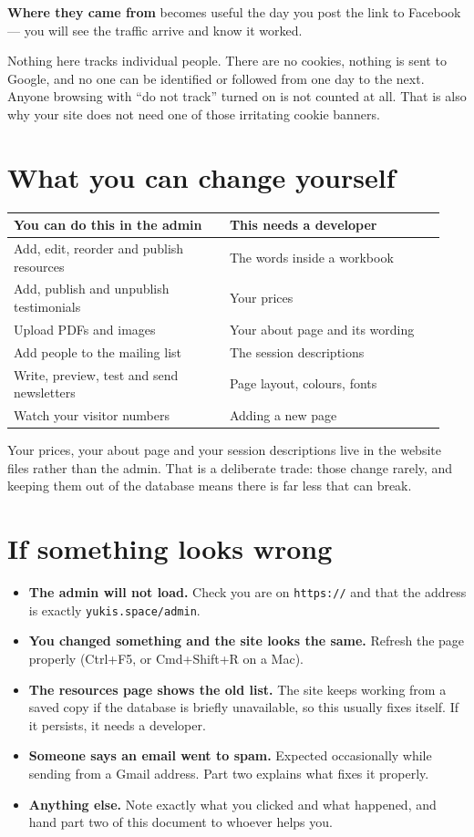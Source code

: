 \documentclass[11pt,a4paper]{article}
\newcommand{\lead}[1]{\textbf{\color{ink}#1}}
\newcommand{\code}[1]{\texttt{\small #1}}
\begin{document}
\lead{Where they came from} becomes useful the day you post the link to
Facebook --- you will see the traffic arrive and know it worked.

Nothing here tracks individual people. There are no cookies, nothing is sent to
Google, and no one can be identified or followed from one day to the next.
Anyone browsing with ``do not track'' turned on is not counted at all. That is
also why your site does not need one of those irritating cookie banners.

\section{What you can change yourself}

\begin{longtable}{@{}p{0.47\linewidth}p{0.47\linewidth}@{}}
\toprule
\textbf{You can do this in the admin} & \textbf{This needs a developer} \\
\midrule
\endhead
Add, edit, reorder and publish resources & The words inside a workbook \\
Add, publish and unpublish testimonials & Your prices \\
Upload PDFs and images & Your about page and its wording \\
Add people to the mailing list & The session descriptions \\
Write, preview, test and send newsletters & Page layout, colours, fonts \\
Watch your visitor numbers & Adding a new page \\
\bottomrule
\end{longtable}

Your prices, your about page and your session descriptions live in the website
files rather than the admin. That is a deliberate trade: those change rarely,
and keeping them out of the database means there is far less that can break.

\section{If something looks wrong}

\begin{itemize}
  \item \lead{The admin will not load.} Check you are on \code{https://} and
        that the address is exactly \code{yukis.space/admin}.
  \item \lead{You changed something and the site looks the same.} Refresh the
        page properly (Ctrl+F5, or Cmd+Shift+R on a Mac).
  \item \lead{The resources page shows the old list.} The site keeps working
        from a saved copy if the database is briefly unavailable, so this
        usually fixes itself. If it persists, it needs a developer.
  \item \lead{Someone says an email went to spam.} Expected occasionally while
        sending from a Gmail address. Part two explains what fixes it properly.
  \item \lead{Anything else.} Note exactly what you clicked and what happened,
        and hand part two of this document to whoever helps you.
\end{itemize}
\end{document}
